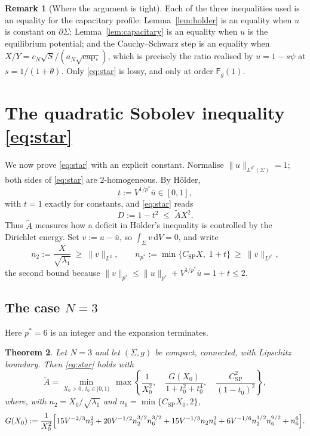 \documentclass[11pt,reqno]{amsart}
\theoremstyle{plain}
\newtheorem{theorem}{Theorem}[section]
\theoremstyle{definition}
\newtheorem{remark}[theorem]{Remark}
\newcommand{\aN}{a_N}
\newcommand{\cN}{c_N}
\newcommand{\pstar}{p^{*}}
\newcommand{\cpstar}{\operatorname{cap}_{*}}
\newcommand{\Fq}{\mathsf{F}}
\newcommand{\Csp}{C_{\mathrm{SP}}}
\newcommand{\Atil}{\widetilde{A}}
\newcommand{\dd}{\,\mathrm{d}}
\begin{document}
\begin{remark}[Where the argument is tight]
\label{rem:tight}
Each of the three inequalities used is an equality for the capacitary profile:
Lemma~\ref{lem:holder} is an equality when $u$ is constant on $\partial\Sigma$;
Lemma~\ref{lem:capacitary} is an equality when $u$ is the equilibrium potential;
and the Cauchy--Schwarz step is an equality when
$X/Y=\cN\sqrt S/(\aN\sqrt{\cpstar})$, which is precisely the ratio realised by
$u=1-s\psi$ at $s=1/(1+\theta)$. Only \eqref{eq:star} is lossy, and only at order
$\Fq_g(1)$.
\end{remark}

\section{The quadratic Sobolev inequality \texorpdfstring{\eqref{eq:star}}{(star)}}
\label{sec:star}

We now prove \eqref{eq:star} with an explicit constant. Normalise
$\|u\|_{L^{\pstar}(\Sigma)}=1$; both sides of \eqref{eq:star} are $2$-homogeneous.
By Hölder,
\begin{equation}
\label{eq:t}
  t:=V^{1/\pstar}\bar u\in[0,1],
\end{equation}
with $t=1$ exactly for constants, and \eqref{eq:star} reads
\begin{equation}
\label{eq:D}
  D:=1-t^2\;\le\;\Atil X^2 .
\end{equation}
Thus $\Atil$ measures how a deficit in Hölder's inequality is controlled by the
Dirichlet energy. Set $v:=u-\bar u$, so $\int_\Sigma v\dd V=0$, and write
\[
  n_2:=\frac{X}{\sqrt{\lambda_1}}\ \ge\ \|v\|_{L^2},
  \qquad
  n_{\pstar}:=\min\bigl\{\Csp X,\;1+t\bigr\}\ \ge\ \|v\|_{L^{\pstar}} ,
\]
the second bound because $\|v\|_{\pstar}\le\|u\|_{\pstar}+V^{1/\pstar}\bar u=1+t\le2$.

\subsection{The case \texorpdfstring{$N=3$}{N = 3}}
Here $\pstar=6$ is an integer and the expansion terminates.

\begin{theorem}
\label{thm:star3}
Let $N=3$ and let $(\Sigma,g)$ be compact, connected, with Lipschitz boundary.
Then \eqref{eq:star} holds with
\begin{equation}
\label{eq:Atil}
  \Atil=\min_{X_0>0,\ t_0\in[0,1)}\ \max\left\{
     \frac1{X_0^2},\quad
     \frac{G(X_0)}{1+t_0^2+t_0^4},\quad
     \frac{\Csp^2}{(1-t_0)^2}\right\},
\end{equation}
where, with $n_2=X_0/\sqrt{\lambda_1}$ and $n_6=\min\{\Csp X_0,2\}$,
\[
  G(X_0):=\frac1{X_0^2}\Bigl[
     15V^{-2/3}n_2^2+20V^{-1/2}n_2^{3/2}n_6^{3/2}
     +15V^{-1/3}n_2n_6^{3}+6V^{-1/6}n_2^{1/2}n_6^{9/2}+n_6^{6}\Bigr].
\]
\end{theorem}
\end{document}
